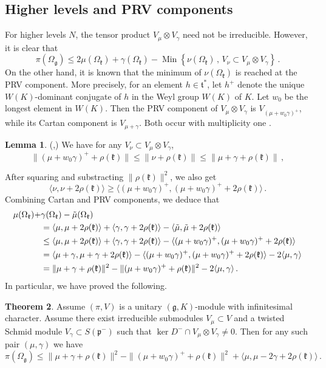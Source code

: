 \documentclass{amsart}[draft,11pt]
\newcommand{\mg}{\mathfrak{g}}
\newcommand{\mk}{\mathfrak{k}}
\newcommand{\fg}{{\mathfrak{g}}}
\newcommand{\fk}{{\mathfrak{k}}}
\newcommand{\fp}{{\mathfrak{p}}}
\numberwithin{equation}{section}
\theoremstyle{definition}
\newtheorem{theorem}{Theorem}[section]
\newtheorem{lemma}[theorem]{Lemma}
\begin{document}
\subsection{Higher levels and PRV components}
For higher levels $N$, the tensor product $V_\mu\otimes V_\gamma$ need not be irreducible.
However, it is clear that
\begin{equation}
\pi(\Omega_\mg) \leq
2\mu(\Omega_\mk)+
\gamma(\Omega_\mk)-
\mathop{\text{Min}}
\left\{\nu(\Omega_\mk)\,,\,V_\nu\subset V_\mu\otimes V_\gamma\right\}\,.
\end{equation}
On the other hand, it is known that the minimum 
of $\nu(\Omega_\fk)$ is reached at the PRV component. More precisely, for an element $h \in \mathfrak{t}^*$, let $h^+$ denote the unique $W(K)$-dominant conjugate of $h$ in the Weyl group $W(K)$ of $K$. Let $w_0$ be the longest element in $W(K)$. Then the PRV component of $V_\mu\otimes V_\gamma$ is $V_{(\mu+w_0\gamma)^+}$, while its Cartan component is 
$V_{\mu+\gamma}$.
Both occur with multiplicity one
\cite[Corollary 1 to Theorem 2.1]{PRV}.
\begin{lemma}(\cite[Lemma 3.2.6]{vogan},\;\cite[Lemma 9.1.6]{wal})
\label{PRVinequality}
We have for any $V_\nu \subset V_\mu \otimes V_\gamma$,
$$
\|(\mu+w_0\gamma)^+ +\rho(\fk)\|\leq \|\nu+\rho(\fk)\|\leq 
\|\mu+\gamma+\rho(\fk)\|
\,,
$$
\end{lemma}
After squaring and substracting $\|\rho(\fk)\|^2$,
we also get
$$
\langle \nu, \nu + 2\rho(\fk) \rangle\geq 
\langle (\mu+w_0\gamma)^+ , (\mu+w_0\gamma)^++2\rho(\fk) \rangle\,.
$$
Combining Cartan and PRV components, we deduce that
\begin{align}
\mu(\Omega_\fk) + &\gamma(\Omega_\fk) -\tilde{\mu}(\Omega_\fk) \notag \\
& = \langle \mu, \mu+2\rho(\mk) \rangle +
\langle \gamma, \gamma +2\rho(\fk) \rangle
- \langle \tilde{\mu},\tilde{\mu} + 2\rho(\fk)
\rangle
\label{baseequality}
 \\
& \leq \langle \mu, \mu+2\rho(\mk) \rangle + 
\langle \gamma, \gamma +2\rho(\fk) \rangle
- \langle (\mu+w_0\gamma)^+,(\mu+w_0\gamma)^+ + 2\rho(\fk) \rangle
\notag
\\
& =  \langle \mu+\gamma, \mu+\gamma+2\rho(\mk) \rangle - 
\langle (\mu+w_0\gamma)^+,(\mu+w_0\gamma)^+
+2\rho(\fk) \rangle
-2\langle \mu,\gamma\rangle
\notag
\\
&
=\|\mu+\gamma+\rho(\fk)\|^2-\|(\mu+w_0\gamma)^++\rho(\fk)\|^2 -2\langle \mu,\gamma \rangle
\,.
\end{align}
In particular, we have proved the following.
\begin{theorem}\label{t:ineq}
Assume $(\pi,V)$ is a unitary $(\fg,K)$-module with infinitesimal character.
Assume there exist irreducible submodules $V_\mu
\subset V$ and a twisted Schmid module $V_\gamma \subset S(\fp^-)$ such that $\ker D^- \cap V_\mu \otimes V_{\gamma}\neq 0$. Then for any such pair
$(\mu,\gamma)$ we have
\begin{equation}
\label{sympineq0}
\pi(\Omega_\mg) \leq \|\mu+\gamma+\rho(\fk)\|^2-\|(\mu+w_0\gamma)^++\rho(\fk)\|^2 +
\langle \mu,\mu -2\gamma + 2\rho(\fk) \rangle\,.
\end{equation}
\end{theorem}
\end{document}
